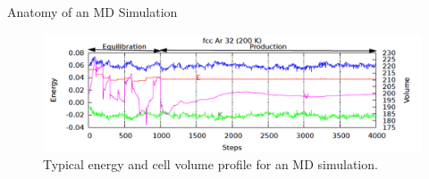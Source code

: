 \documentclass[aspectratio=169]{beamer}
\begin{document}
    \begin{frame}{Anatomy of an MD Simulation}
        \begin{figure}
            \centering
            \includegraphics[width=\linewidth]{lectures/figures/13-MD_simulation.png}
            \caption{Typical energy and cell volume profile for an MD simulation.}
        \end{figure}
    \end{frame}
\end{document}
